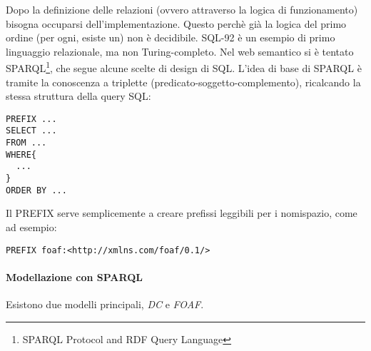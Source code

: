 Dopo la definizione delle relazioni (ovvero attraverso la logica di funzionamento) bisogna occuparsi dell'implementazione. Questo perch\`e gi\`a la logica del primo ordine (per ogni, esiste un) non \`e decidibile. SQL-92 \`e un esempio di primo linguaggio relazionale, ma non Turing-completo. Nel web semantico si \`e tentato SPARQL\footnote{SPARQL Protocol and RDF Query Language}, che segue alcune scelte di design di SQL.
L'idea di base di SPARQL \`e tramite la conoscenza a triplette (predicato-soggetto-complemento), ricalcando la stessa struttura della query SQL:
\begin{verbatim}
PREFIX ...
SELECT ...
FROM ...
WHERE{
  ...
}
ORDER BY ...
\end{verbatim}

Il PREFIX serve semplicemente a creare prefissi leggibili per i nomispazio, come ad esempio:
\begin{verbatim}
PREFIX foaf:<http://xmlns.com/foaf/0.1/>
\end{verbatim}

\paragraph*{Modellazione con SPARQL}

Esistono due modelli principali, \textit{DC} e \textit{FOAF}.

